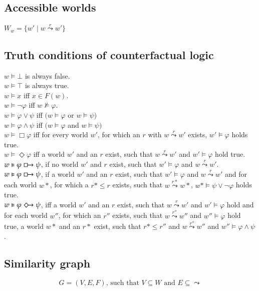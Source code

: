 \documentclass[a4paper,american]{paper}
\theoremstyle{definition}\newtheorem{definition}{Definition}
\begin{document}
\subsection{Accessible worlds}
$W_w = \{w'\mid w \overset{r}{\leadsto} w'\}$

\newpage
\subsection{Truth conditions of counterfactual logic}
$w \vDash \bot$ is always false. \\
$w \vDash \top$ is always true. \\
$w \vDash x$ iff $x \in F(w)$. \\
$w \vDash \neg \varphi$ iff $w \nvDash \varphi$. \\
$w \vDash \varphi \vee \psi$ iff $(w \vDash \varphi$ or $w \vDash \psi)$ \\
$w \vDash \varphi \wedge \psi$ iff $(w \vDash \varphi$ and $w \vDash \psi)$ \\
$w \vDash \Box \varphi$ iff for every world $w'$, for which an $r$ with $w\overset{r}{\leadsto} w'$ exists, $w' \vDash \varphi$ holds true. \\
$w \vDash \Diamond \varphi$ iff a world $w'$ and an $r$ exist, such that $w\overset{r}{\leadsto} w'$ and $w' \vDash \varphi$ hold true. \\
$w \vDash \varphi \boxright \psi$, if no world $w'$ and $r$ exist, such that $w' \vDash \varphi$ and $w\overset{r}{\leadsto} w'$. \\
$w \vDash \varphi \boxright \psi$, if a world $w'$ and an $r$ exist, such that $w'\vDash \varphi$ and $w\overset{r}{\leadsto} w'$ and for each world $w*$, for which a $r*\leq r$ exists, such that $w\overset{r*}{\leadsto} w*$, $w*\vDash\psi\vee\neg\varphi$ holds true. \\
$w \vDash \varphi \Diamondright \psi$, iff a world $w'$ and an $r$ exist, such that $w\overset{r}{\leadsto} w'$ and $w' \vDash \varphi$ hold and for each world $w''$, for which an $r''$ exists, such that $w\overset{r''}{\leadsto}w''$ and $w'' \vDash \varphi$ hold true, a world $w*$ and an $r*$ exist, such that $r* \leq r''$ and $w\overset{r''}{\leadsto}w''$ and $w'' \vDash \varphi \wedge \psi$.
\subsection{Similarity graph}
\begin{equation}
	G = (V,E,F)\text{, such that }V \subseteq W\text{ and }E \subseteq \leadsto
\end{equation}
\end{document}
